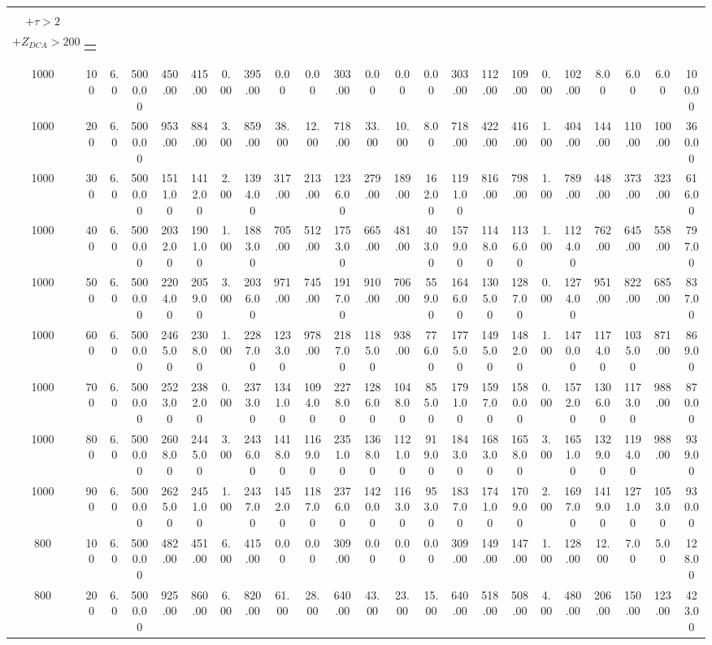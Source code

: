 \documentclass[8pt]{extarticle}
\begin{document}
\begin{longtable}{|c|c|c|c|c|c|c|c|c|c|c|c|c|c|c|c|c|c|c|c|c|c|c|}
\begin{tabular}{@{}c@{}} $E_T^{miss} > 75$ \\ $+ \tau > 2$ \\ $+Z_{DCA} > 200$\end{tabular} & \begin{tabular}{@{}c@{}} $E_{T}^{miss} > 75$ $+ \tau < 4$ \end{tabular} \\ 
\hline 
1000&100&6.0&5000.00&450.00&415.00&0.00&395.00&0.00&0.00&303.00&0.00&0.00&0.00&303.00&112.00&109.00&0.00&102.00&8.00&6.00&6.00&100.00\\ 
\hline 
1000&200&6.0&5000.00&953.00&884.00&3.00&859.00&38.00&12.00&718.00&33.00&10.00&8.00&718.00&422.00&416.00&1.00&404.00&144.00&110.00&100.00&360.00\\ 
\hline 
1000&300&6.0&5000.00&1511.00&1412.00&2.00&1394.00&317.00&213.00&1236.00&279.00&189.00&162.00&1191.00&816.00&798.00&1.00&789.00&448.00&373.00&323.00&616.00\\ 
\hline 
1000&400&6.0&5000.00&2032.00&1901.00&1.00&1883.00&705.00&512.00&1753.00&665.00&481.00&403.00&1579.00&1148.00&1136.00&1.00&1124.00&762.00&645.00&558.00&797.00\\ 
\hline 
1000&500&6.0&5000.00&2204.00&2059.00&3.00&2036.00&971.00&745.00&1917.00&910.00&706.00&559.00&1646.00&1305.00&1287.00&0.00&1274.00&951.00&822.00&685.00&837.00\\ 
\hline 
1000&600&6.0&5000.00&2465.00&2308.00&1.00&2287.00&1233.00&978.00&2187.00&1185.00&938.00&776.00&1775.00&1495.00&1482.00&1.00&1470.00&1174.00&1035.00&871.00&869.00\\ 
\hline 
1000&700&6.0&5000.00&2523.00&2382.00&0.00&2373.00&1341.00&1094.00&2278.00&1286.00&1048.00&855.00&1791.00&1597.00&1580.00&0.00&1572.00&1306.00&1173.00&988.00&870.00\\ 
\hline 
1000&800&6.0&5000.00&2608.00&2445.00&3.00&2436.00&1418.00&1169.00&2351.00&1368.00&1121.00&919.00&1843.00&1683.00&1658.00&3.00&1651.00&1329.00&1194.00&988.00&939.00\\ 
\hline 
1000&900&6.0&5000.00&2625.00&2451.00&1.00&2437.00&1452.00&1187.00&2376.00&1420.00&1163.00&953.00&1837.00&1741.00&1709.00&2.00&1697.00&1419.00&1271.00&1053.00&930.00\\ 
\hline 
800&100&6.0&5000.00&482.00&451.00&6.00&415.00&0.00&0.00&309.00&0.00&0.00&0.00&309.00&149.00&147.00&1.00&128.00&12.00&7.00&5.00&128.00\\ 
\hline 
800&200&6.0&5000.00&925.00&860.00&6.00&820.00&61.00&28.00&640.00&43.00&23.00&15.00&640.00&518.00&508.00&4.00&480.00&206.00&150.00&123.00&423.00\\ 

\end{longtable}
\end{document}
